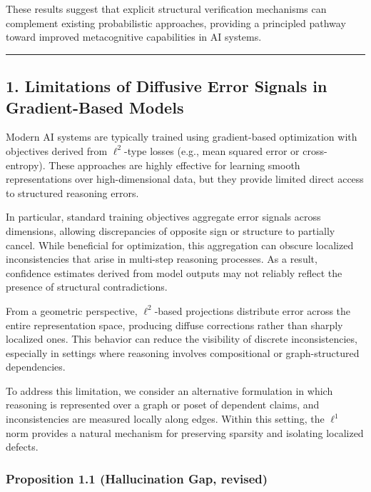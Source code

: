 \documentclass[
]{article}
\begin{document}
These results suggest that explicit structural verification mechanisms
can complement existing probabilistic approaches, providing a principled
pathway toward improved metacognitive capabilities in AI systems.

\begin{center}\rule{0.5\linewidth}{0.5pt}\end{center}

\subsection{1. Limitations of Diffusive Error Signals in Gradient-Based
Models}\label{limitations-of-diffusive-error-signals-in-gradient-based-models}

Modern AI systems are typically trained using gradient-based
optimization with objectives derived from \(\ell^2\)-type losses (e.g.,
mean squared error or cross-entropy). These approaches are highly
effective for learning smooth representations over high-dimensional
data, but they provide limited direct access to structured reasoning
errors.

In particular, standard training objectives aggregate error signals
across dimensions, allowing discrepancies of opposite sign or structure
to partially cancel. While beneficial for optimization, this aggregation
can obscure localized inconsistencies that arise in multi-step reasoning
processes. As a result, confidence estimates derived from model outputs
may not reliably reflect the presence of structural contradictions.

From a geometric perspective, \(\ell^2\)-based projections distribute
error across the entire representation space, producing diffuse
corrections rather than sharply localized ones. This behavior can reduce
the visibility of discrete inconsistencies, especially in settings where
reasoning involves compositional or graph-structured dependencies.

To address this limitation, we consider an alternative formulation in
which reasoning is represented over a graph or poset of dependent
claims, and inconsistencies are measured locally along edges. Within
this setting, the \(\ell^1\) norm provides a natural mechanism for
preserving sparsity and isolating localized defects.

\subsubsection{Proposition 1.1 (Hallucination Gap,
revised)}\label{proposition-1.1-hallucination-gap-revised}
\end{document}
